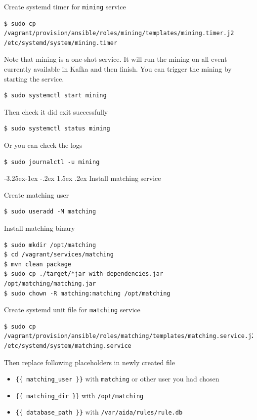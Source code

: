 \documentclass[a4paper]{article} %
\makeatletter
\renewcommand{\normalsize}{\fontsize{12}{15}\selectfont\color{textcolor}}
\renewcommand\subsubsection{\@startsection{subsubsection}{3}{\z@}%
                   {-3.25ex\@plus -1ex \@minus -.2ex}%
                   {1.5ex \@plus .2ex}%
                   {\normalfont\normalsize\sffamily\bfseries\color{projectcolor}}}
\makeatother
\begin{document}
Create systemd timer for \texttt{mining} service
\begin{lstlisting}
$ sudo cp /vagrant/provision/ansible/roles/mining/templates/mining.timer.j2 /etc/systemd/system/mining.timer
\end{lstlisting}

Note that mining is a one-shot service. It will run the mining on all event currently available in Kafka and then finish.
You can trigger the mining by starting the service.
\begin{lstlisting}
$ sudo systemctl start mining
\end{lstlisting}

Then check it did exit successfully
\begin{lstlisting}
$ sudo systemctl status mining
\end{lstlisting}

Or you can check the logs
\begin{lstlisting}
$ sudo journalctl -u mining
\end{lstlisting}


\subsubsection{Install matching service}

Create matching user
\begin{lstlisting}
$ sudo useradd -M matching
\end{lstlisting}

Install matching binary
\begin{lstlisting}
$ sudo mkdir /opt/matching
$ cd /vagrant/services/matching
$ mvn clean package
$ sudo cp ./target/*jar-with-dependencies.jar /opt/matching/matching.jar
$ sudo chown -R matching:matching /opt/matching
\end{lstlisting}

Create systemd unit file for \texttt{matching} service
\begin{lstlisting}
$ sudo cp /vagrant/provision/ansible/roles/matching/templates/matching.service.j2 /etc/systemd/system/matching.service
\end{lstlisting}

Then replace following placeholders in newly created file
\begin{itemize}
\item \texttt{\{\{ matching\_user \}\}} with \texttt{matching} or other user you had chosen
\item \texttt{\{\{ matching\_dir \}\}} with \texttt{/opt/matching}
\item \texttt{\{\{ database\_path \}\}} with \texttt{/var/aida/rules/rule.db}
\end{itemize}
\end{document}
